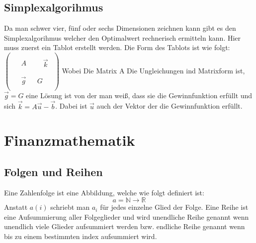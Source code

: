 \documentclass[a4paper]{scrartcl}
\begin{document}
    \subsection{Simplexalgorihmus}
    Da man schwer vier, fünf oder sechs Dimensionen zeichnen kann gibt es den Simplexalgorihmus welcher den Optimalwert rechnerisch ermitteln kann. Hier muss zuerst ein Tablot erstellt werden.
    Die Form des Tablots ist wie folgt:
    \(
        \begin{pmatrix}
            \begin{matrix}
                 &   & \\
                 & A & \\
                 &   & 
            \end{matrix}
            \begin{matrix}
               & \\ & \vec{k} \\ &   
            \end{matrix} \\

            \hline
            \begin{matrix}
                &\vec{g} & &  G \\             
            \end{matrix}   
        \end{pmatrix}
    \)
    Wobei Die Matrix A Die Ungleichungen ind Matrixform ist, \(\vec{g} = G\) eine Lösung ist von der man weiß, dass sie die Gewinnfunktion erfüllt und sich \(\vec{k} = A\vec{u} - \vec{b}\). Dabei ist
    \(\vec{u}\) auch der Vektor der die Gewinnfunktion erfüllt. 

    \section{Finanzmathematik}
        \subsection{Folgen und Reihen}
        Eine Zahlenfolge ist eine Abbildung, welche wie folgt definiert ist:
        \begin{equation*}
            a = \mathbb{N} \rightarrow \mathbb{R}
        \end{equation*}
        Anstatt \(a(i)\) schriebt man \(a_i\) für jedes einzelne Glied der Folge. 
        Eine Reihe ist eine Aufsummierung aller Folgeglieder und wird unendliche Reihe genannt wenn unendlich viele Glieder aufsummiert werden bzw. endliche Reihe genannt wenn bis zu einem 
        bestimmten index aufsummiert wird. 
        
\end{document}
